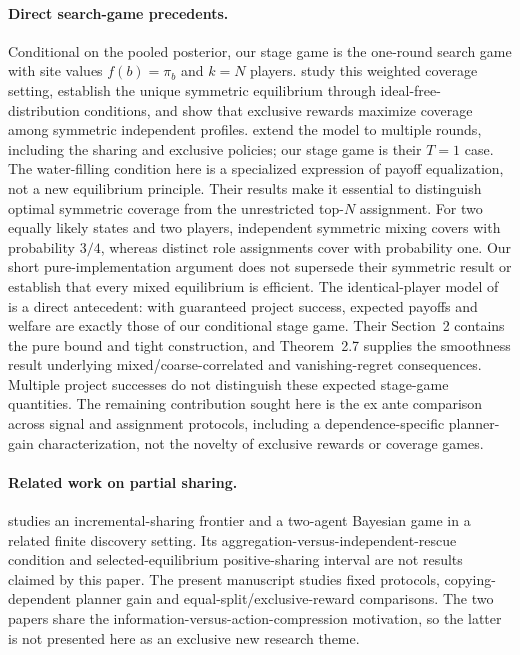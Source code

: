 \documentclass[11pt]{article}
\theoremstyle{definition}
\theoremstyle{remark}
\newcommand{\1}{\mathbf{1}}
\begin{document}
\paragraph{Direct search-game precedents.}
Conditional on the pooled posterior, our stage game is the one-round search game with site values $f(b)=\pi_b$ and $k=N$ players. \citet{ColletKorman2018} study this weighted coverage setting, establish the unique symmetric equilibrium through ideal-free-distribution conditions, and show that exclusive rewards maximize coverage among symmetric independent profiles. \citet{KormanRodeh2020} extend the model to multiple rounds, including the sharing and exclusive policies; our stage game is their $T=1$ case. The water-filling condition here is a specialized expression of payoff equalization, not a new equilibrium principle. Their results make it essential to distinguish optimal symmetric coverage from the unrestricted top-$N$ assignment. For two equally likely states and two players, independent symmetric mixing covers with probability $3/4$, whereas distinct role assignments cover with probability one. Our short pure-implementation argument does not supersede their symmetric result or establish that every mixed equilibrium is efficient. The identical-player model of \citet{KleinbergOren2011} is a direct antecedent: with guaranteed project success, expected payoffs and welfare are exactly those of our conditional stage game. Their Section~2 contains the pure bound and tight construction, and Theorem~2.7 supplies the smoothness result underlying mixed/coarse-correlated and vanishing-regret consequences. Multiple project successes do not distinguish these expected stage-game quantities. The remaining contribution sought here is the ex ante comparison across signal and assignment protocols, including a dependence-specific planner-gain characterization, not the novelty of exclusive rewards or coverage games.

\paragraph{Related work on partial sharing.}
\citet{Nakajima2026Frontier} studies an incremental-sharing frontier and a two-agent Bayesian game in a related finite discovery setting. Its aggregation-versus-independent-rescue condition and selected-equilibrium positive-sharing interval are not results claimed by this paper. The present manuscript studies fixed protocols, copying-dependent planner gain and equal-split/exclusive-reward comparisons. The two papers share the information-versus-action-compression motivation, so the latter is not presented here as an exclusive new research theme.
\end{document}
